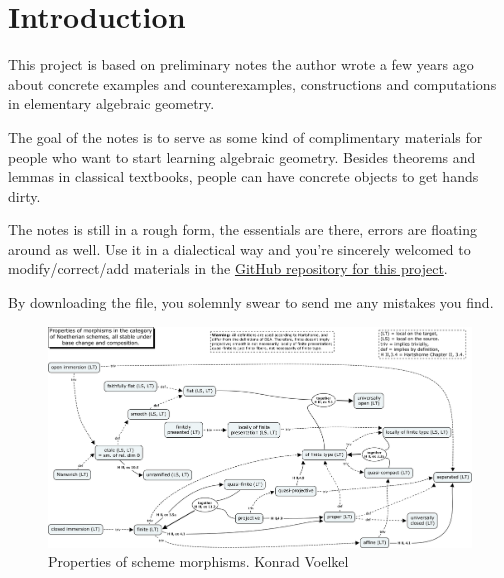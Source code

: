 \documentclass[../main.tex]{subfiles}
\begin{document}
\section{Introduction}\label{sec:Introduction}
This project is based on preliminary notes the author wrote a few years ago 
about concrete examples and counterexamples, constructions and computations in elementary algebraic geometry.

The goal of the notes is to serve as some kind of complimentary materials for people who want
to start learning algebraic geometry. Besides theorems and lemmas in classical textbooks,
people can have concrete objects to get hands dirty. 

The notes is still in a rough form, the essentials are there, errors are floating around as well. 
Use it in a dialectical way and you're sincerely welcomed to modify/correct/add materials in the \href{https://github.com/Waerden001/Examples-and-Counterexamples-in-Elementary-Algebraic-Geometry}{GitHub repository for this project}. 

By downloading the file, you solemnly swear to send me any mistakes you find.
\begin{figure}[h!]
\centering
\includegraphics[width=\textwidth]{img/morphisms.png}
\caption{Properties of scheme morphisms. Konrad Voelkel}
\label{fig:Properties of sheme morphims; Konrad Voelkel}
\end{figure}
\end{document}

